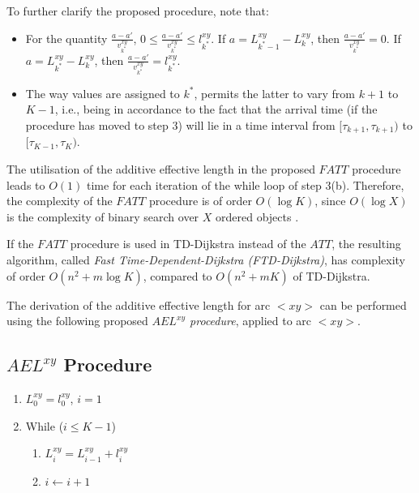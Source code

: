 \documentclass[conference]{IEEEtran}
\begin{document}
To further clarify the proposed procedure, note that:

\begin{itemize}
    \item For the quantity $\frac{a-a'}{v_{k^*}^{xy}}$, $0\leq \frac{a-a'}{v_{k^*}^{xy}} \leq l^{xy}_{k^*}$. If $a=L_{k^*-1}^{xy}-L_{k}^{xy}$, then $\frac{a-a'}{v_{k^*}^{xy}}=0$. If $a = L_{k^*}^{xy}-L_{k}^{xy}$, then  $\frac{a-a'}{v_{k^*}^{xy}}=l^{xy}_{k^*}$.  
    \item The way values are assigned to $k^*$, permits the latter to vary from $k+1$ to $K-1$, i.e., being in accordance to the fact that the arrival time (if the procedure has moved to step 3) will lie in a time interval from $[\tau_{k+1}, \tau_{k+1})$ to $[\tau_{K-1}, \tau_{K})$. 
\end{itemize}


   
The utilisation of the additive effective length in the proposed $FATT$ procedure leads to $O(1)$ time for each iteration of the while loop of step 3(b). Therefore, the complexity of the $FATT$ procedure is of order $O(\log K)$, since $O(\log X)$ is the complexity of binary search over $X$ ordered objects \cite{ahuja}. 



If the $FATT$ procedure is used in TD-Dijkstra instead of the $ATT$, the resulting algorithm, called \emph{Fast Time-Dependent-Dijkstra (FTD-Dijkstra)}, has complexity of order $O(n^2+m\log K)$, compared to $O(n^2+mK)$ of TD-Dijkstra.  

The derivation of the additive effective length for arc $<xy>$ can be performed using the following proposed \emph{$AEL^{xy}$ procedure}, applied to arc $<xy>$.

\subsection{$AEL^{xy}$ Procedure}

\begin{enumerate}
    \item $L_0^{xy}=l_0^{xy}$, $i=1$ 
    \item While ($i\leq K-1$)
    \begin{enumerate}
        \item $L_i^{xy}=L_{i-1}^{xy}+l_i^{xy}$
        \item $i\leftarrow i+1$
    \end{enumerate}    
\end{enumerate}
\end{document}
